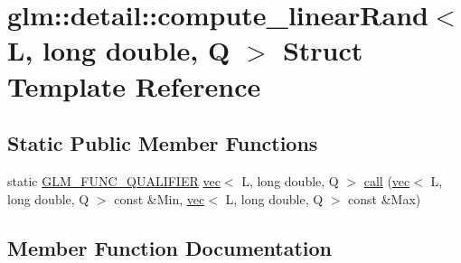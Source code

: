 \hypertarget{structglm_1_1detail_1_1compute__linear_rand_3_01_l_00_01long_01double_00_01_q_01_4}{}\section{glm\+:\+:detail\+:\+:compute\+\_\+linear\+Rand$<$ L, long double, Q $>$ Struct Template Reference}
\label{structglm_1_1detail_1_1compute__linear_rand_3_01_l_00_01long_01double_00_01_q_01_4}
\subsection*{Static Public Member Functions}
\begin{DoxyCompactItemize}
\item 
static \mbox{\hyperlink{setup_8hpp_a33fdea6f91c5f834105f7415e2a64407}{G\+L\+M\+\_\+\+F\+U\+N\+C\+\_\+\+Q\+U\+A\+L\+I\+F\+I\+ER}} \mbox{\hyperlink{structglm_1_1vec}{vec}}$<$ L, long double, Q $>$ \mbox{\hyperlink{structglm_1_1detail_1_1compute__linear_rand_3_01_l_00_01long_01double_00_01_q_01_4_a9773bef01dd011a5489e8e602553993a}{call}} (\mbox{\hyperlink{structglm_1_1vec}{vec}}$<$ L, long double, Q $>$ const \&Min, \mbox{\hyperlink{structglm_1_1vec}{vec}}$<$ L, long double, Q $>$ const \&Max)
\end{DoxyCompactItemize}


\subsection{Member Function Documentation}
\mbox{\label{structglm_1_1detail_1_1compute__linear_rand_3_01_l_00_01long_01double_00_01_q_01_4_a9773bef01dd011a5489e8e602553993a}} 
